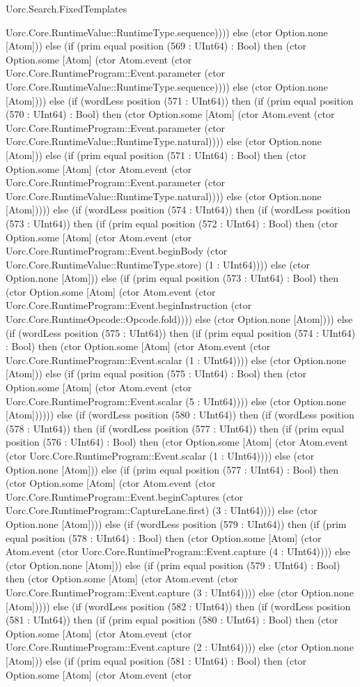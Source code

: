 \begin{lexlean}{Uorc.Search.FixedTemplates}
\begin{semanticmodule}
{Uorc.Core.RuntimeValue::RuntimeType.sequence)))) else (ctor Option.none [Atom])) else (if (prim equal position (569 : UInt64) : Bool) then (ctor Option.some [Atom] (ctor Atom.event (ctor Uorc.Core.RuntimeProgram::Event.parameter (ctor Uorc.Core.RuntimeValue::RuntimeType.sequence)))) else (ctor Option.none [Atom]))) else (if (wordLess position (571 : UInt64)) then (if (prim equal position (570 : UInt64) : Bool) then (ctor Option.some [Atom] (ctor Atom.event (ctor Uorc.Core.RuntimeProgram::Event.parameter (ctor Uorc.Core.RuntimeValue::RuntimeType.natural)))) else (ctor Option.none [Atom])) else (if (prim equal position (571 : UInt64) : Bool) then (ctor Option.some [Atom] (ctor Atom.event (ctor Uorc.Core.RuntimeProgram::Event.parameter (ctor Uorc.Core.RuntimeValue::RuntimeType.natural)))) else (ctor Option.none [Atom])))) else (if (wordLess position (574 : UInt64)) then (if (wordLess position (573 : UInt64)) then (if (prim equal position (572 : UInt64) : Bool) then (ctor Option.some [Atom] (ctor Atom.event (ctor Uorc.Core.RuntimeProgram::Event.beginBody (ctor Uorc.Core.RuntimeValue::RuntimeType.store) (1 : UInt64)))) else (ctor Option.none [Atom])) else (if (prim equal position (573 : UInt64) : Bool) then (ctor Option.some [Atom] (ctor Atom.event (ctor Uorc.Core.RuntimeProgram::Event.beginInstruction (ctor Uorc.Core.RuntimeOpcode::Opcode.fold)))) else (ctor Option.none [Atom]))) else (if (wordLess position (575 : UInt64)) then (if (prim equal position (574 : UInt64) : Bool) then (ctor Option.some [Atom] (ctor Atom.event (ctor Uorc.Core.RuntimeProgram::Event.scalar (1 : UInt64)))) else (ctor Option.none [Atom])) else (if (prim equal position (575 : UInt64) : Bool) then (ctor Option.some [Atom] (ctor Atom.event (ctor Uorc.Core.RuntimeProgram::Event.scalar (5 : UInt64)))) else (ctor Option.none [Atom]))))) else (if (wordLess position (580 : UInt64)) then (if (wordLess position (578 : UInt64)) then (if (wordLess position (577 : UInt64)) then (if (prim equal position (576 : UInt64) : Bool) then (ctor Option.some [Atom] (ctor Atom.event (ctor Uorc.Core.RuntimeProgram::Event.scalar (1 : UInt64)))) else (ctor Option.none [Atom])) else (if (prim equal position (577 : UInt64) : Bool) then (ctor Option.some [Atom] (ctor Atom.event (ctor Uorc.Core.RuntimeProgram::Event.beginCaptures (ctor Uorc.Core.RuntimeProgram::CaptureLane.first) (3 : UInt64)))) else (ctor Option.none [Atom]))) else (if (wordLess position (579 : UInt64)) then (if (prim equal position (578 : UInt64) : Bool) then (ctor Option.some [Atom] (ctor Atom.event (ctor Uorc.Core.RuntimeProgram::Event.capture (4 : UInt64)))) else (ctor Option.none [Atom])) else (if (prim equal position (579 : UInt64) : Bool) then (ctor Option.some [Atom] (ctor Atom.event (ctor Uorc.Core.RuntimeProgram::Event.capture (3 : UInt64)))) else (ctor Option.none [Atom])))) else (if (wordLess position (582 : UInt64)) then (if (wordLess position (581 : UInt64)) then (if (prim equal position (580 : UInt64) : Bool) then (ctor Option.some [Atom] (ctor Atom.event (ctor Uorc.Core.RuntimeProgram::Event.capture (2 : UInt64)))) else (ctor Option.none [Atom])) else (if (prim equal position (581 : UInt64) : Bool) then (ctor Option.some [Atom] (ctor Atom.event (ctor }
\end{semanticmodule}
\end{lexlean}
